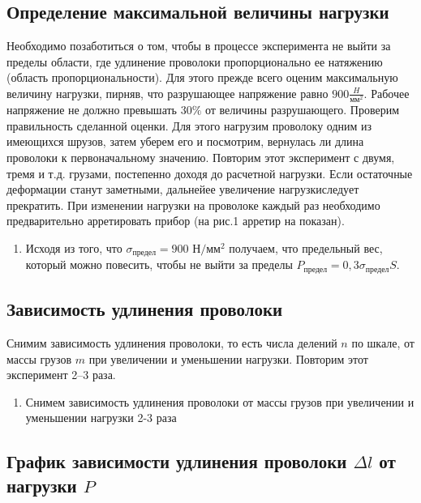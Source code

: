 \documentclass[a4paper, 12pt]{article}%
\begin{document}
\subsection{Определение максимальной величины нагрузки}

Необходимо позаботиться о том, чтобы в процессе эксперимента не выйти за пределы области, где удлинение проволоки пропорционально ее натяжению (область пропорциональности). Для этого прежде всего оценим максимальную величину нагрузки, пирняв, что разрушающее напряжение равно $900 \frac{H}{\text{мм}^2}$. Рабочее напряжение не должно превышать $30 \%$ от величины разрушающего. Проверим правильность сделанной оценки. Для этого нагрузим проволоку одним из имеющихся шрузов, затем уберем его и посмотрим, вернулась ли длина проволоки к первоначальному значению. Повторим этот эксперимент с двумя, тремя и т.д. грузами, постепенно доходя до расчетной нагрузки. Если остаточные деформации станут заметными, дальнейее увеличение нагрузкиследует прекратить. При изменении нагрузки на проволоке каждый раз необходимо предварительно арретировать прибор (на рис.1 арретир на показан).

\begin{enumerate}
\item Исходя из того, что $\sigma_{\text{предел}} = 900 \text{ Н}/\text{мм}^2$ получаем, что предельный вес, который можно повесить, чтобы не выйти за пределы $P_{\text{предел}} = 0,3 \sigma_{\text{предел}} S$. 
\end{enumerate}

\subsection{Зависимость удлинения проволоки}

Снимим зависимость удлинения проволоки, то есть числа делений $n$ по шкале, от массы грузов $m$ при увеличении и уменьшении нагрузки. Повторим этот эксперимент 2--3 раза.

\begin{enumerate}
\item Снимем зависимость удлинения проволоки от массы грузов при увеличении и уменьшении нагрузки 2-3 раза 
\end{enumerate}

\subsection{График зависимости удлинения проволоки $\Delta l $ от нагрузки $P$}
\end{document}
